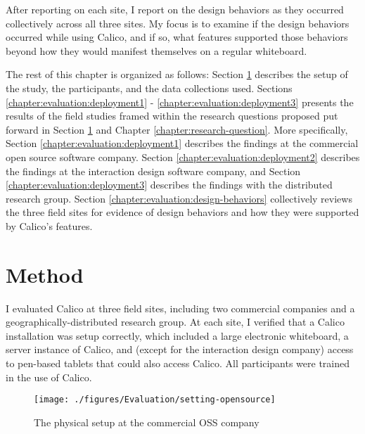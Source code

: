 After reporting on each site, I report on the design behaviors as they occurred collectively across all three sites. My focus is to examine if the design behaviors occurred  while using Calico, and if so, what features supported those behaviors beyond how they would manifest themselves on a regular whiteboard.

The rest of this chapter is organized as follows: Section \ref{chapter:evaluation:overview} describes the setup of the study, the participants, and the data collections used. Sections \ref{chapter:evaluation:deployment1} - \ref{chapter:evaluation:deployment3} presents the results of the field studies framed within the research questions proposed put forward in Section \ref{chapter:evaluation:overview} and Chapter \ref{chapter:research-question}. More specifically, Section \ref{chapter:evaluation:deployment1} describes the findings at the commercial open source software company. Section \ref{chapter:evaluation:deployment2} describes the findings at the interaction design software company, and Section \ref{chapter:evaluation:deployment3} describes the findings with the distributed research group. Section \ref{chapter:evaluation:design-behaviors} collectively reviews the three field sites for evidence of design behaviors and how they were supported by Calico's features. 

\section{Method}
\label{chapter:evaluation:overview}

I evaluated Calico at three field sites, including two commercial companies and a geographically-distributed research group. At each site, I verified that a Calico installation was setup correctly, which included a large electronic whiteboard, a server instance of Calico, and (except for the interaction design company) access to pen-based tablets that could also access Calico. All participants were trained in the use of Calico.

\begin{figure*}[tbh]
  \centering
  \texttt{[image: ./figures/Evaluation/setting-opensource]}
  \caption{The physical setup at the commercial OSS company}
  \label{fig:evaluation:setting-opensource}
\end{figure*}

